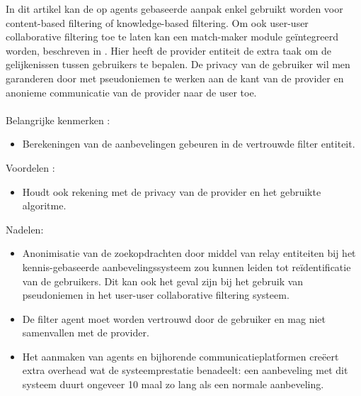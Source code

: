 In dit artikel kan de op agents gebaseerde aanpak enkel gebruikt worden voor content-based filtering of knowledge-based filtering. Om ook user-user collaborative filtering toe te laten kan  een match-maker module ge\"integreerd worden, beschreven in \cite{CisseeThesis2009}. Hier heeft de provider entiteit de extra taak om de gelijkenissen tussen gebruikers te bepalen. De privacy van de gebruiker wil men garanderen door met pseudoniemen te werken aan de kant van de provider en anonieme communicatie van de provider naar de user toe.\\\\
Belangrijke kenmerken : 
\begin{itemize}


\item Berekeningen van de aanbevelingen gebeuren in de vertrouwde filter entiteit.
\end{itemize}
Voordelen : 
\begin{itemize}


\item Houdt ook rekening met de privacy van de provider en het gebruikte algoritme.

\end{itemize}
Nadelen:
\begin{itemize}
\item Anonimisatie van de zoekopdrachten door middel van relay entiteiten bij het kennis-gebaseerde aanbevelingssysteem zou kunnen leiden tot re\"identificatie van de gebruikers. Dit kan ook het geval zijn bij het gebruik van pseudoniemen in het user-user collaborative filtering systeem.
\item De filter agent moet worden vertrouwd door de gebruiker en mag niet samenvallen met de provider.
\item Het aanmaken van agents en bijhorende communicatieplatformen cre\" eert extra overhead wat de systeemprestatie benadeelt: een aanbeveling met dit systeem duurt ongeveer 10 maal zo lang als een normale aanbeveling.

\end{itemize}